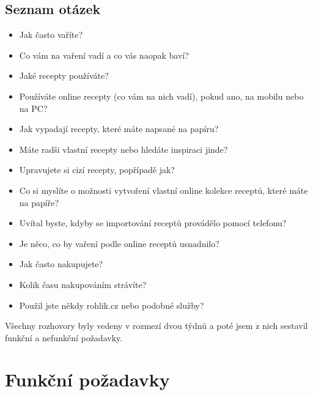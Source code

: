 \subsection{Seznam otázek}
\begin{itemize}
    \item Jak často vaříte?
    \item Co vám na vaření vadí a co vás naopak baví?
    \item Jaké recepty používáte?
    \item Používáte online recepty (co vám na nich vadí), pokud ano, na mobilu nebo na PC?
    \item Jak vypadají recepty, které máte napsané na papíru?
    \item Máte radši vlastní recepty nebo hledáte inspiraci jinde?
    \item Upravujete si cizí recepty, popřípadě jak?
    \item Co si myslíte o možnosti vytvoření vlastní online kolekce receptů, které máte na papíře?
    \item Uvítal byste, kdyby se importování receptů provádělo pomocí telefonu?
    \item Je něco, co by vaření podle online receptů usnadnilo?
    \item Jak často nakupujete?
    \item Kolik času nakupováním strávíte?
    \item Použil jste někdy rohlik.cz nebo podobné služby?
\end{itemize}

Všechny rozhovory byly vedeny v rozmezí dvou týdnů a poté jsem z nich sestavil funkční a nefunkční požadavky.

\section{Funkční požadavky}


